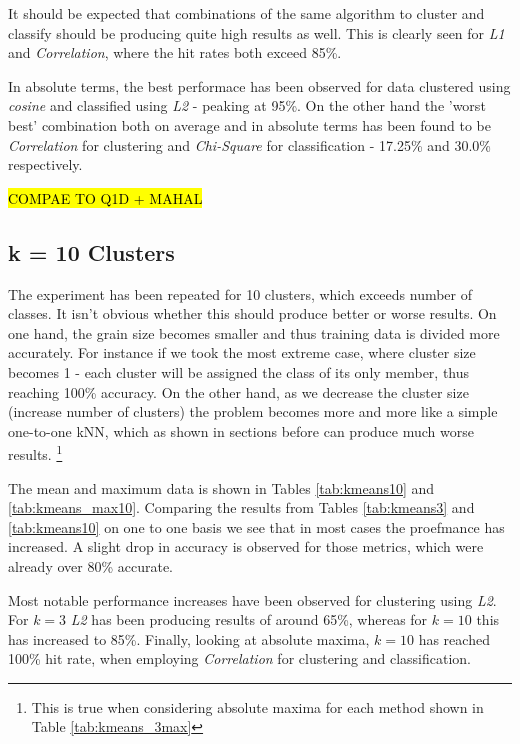 \documentclass[10pt,twocolumn,letterpaper]{article}
\begin{document}
It should be expected that combinations of the same algorithm to cluster and classify should be producing quite high results as well. This is clearly seen for \textit{L1} and \textit{Correlation}, where the hit rates both exceed 85\%.

In absolute terms, the best performace has been observed for data clustered using \textit{cosine} and classified using \textit{L2} - peaking at 95\%. On the other hand the 'worst best' combination both on average and in absolute terms has been found to be \textit{Correlation} for clustering and \textit{Chi-Square} for classification - 17.25\% and 30.0\% respectively.
 
\hl{COMPAE TO Q1D + MAHAL}
 
\subsection{k = 10 Clusters}

The experiment has been repeated for 10 clusters, which exceeds number of classes. It isn't obvious whether this should produce better or worse results. On one hand, the grain size becomes smaller and thus training data is divided more accurately. For instance if we took the most extreme case, where cluster size becomes 1 - each cluster will be assigned the class of its only member, thus reaching 100\% accuracy. On the other hand, as we decrease the cluster size (increase number of clusters) the problem becomes more and more like a simple one-to-one kNN, which as shown in sections before can produce much worse results. \footnote{This is true when considering absolute maxima for each method shown in Table \ref{tab:kmeans_3max}}

The mean and maximum data is shown in Tables \ref{tab:kmeans10}
and \ref{tab:kmeans_max10}. Comparing the results from Tables \ref{tab:kmeans3} and \ref{tab:kmeans10} on one to one basis we see that in most cases the proefmance has increased. A slight drop in accuracy is observed for those metrics, which were already over 80\% accurate. 

Most notable performance increases have been observed for clustering using \textit{L2}. For $k=3$ \textit{L2} has been producing results of around 65\%, whereas for $k=10$ this has increased to 85\%. Finally, looking at absolute maxima, $k=10$ has reached 100\% hit rate, when employing \textit{Correlation} for clustering and classification.
\end{document}
